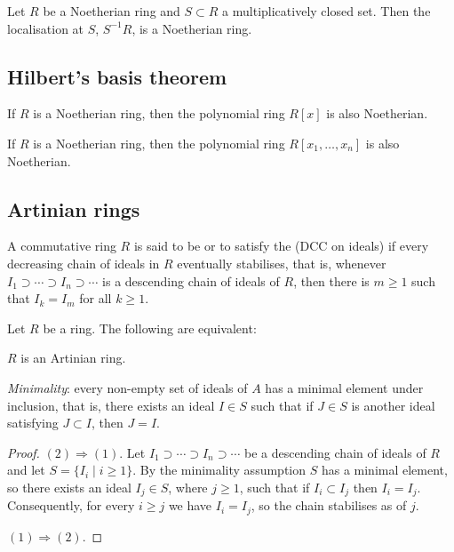 \begin{prop}
	Let $R$ be a Noetherian ring and $S \subset R$ a multiplicatively closed set. Then the localisation at $S$, $S^{-1} R$, is a Noetherian ring.
\end{prop}

\subsection{Hilbert's basis theorem}

\begin{theorem}
	If $R$ is a Noetherian ring, then the polynomial ring $R[x]$ is also Noetherian.
\end{theorem}

\begin{col}
	If $R$ is a Noetherian ring, then the polynomial ring $R[x_1, \ldots, x_n]$ is also Noetherian.
\end{col}

\subsection{Artinian rings}

\begin{definition}
	A commutative ring $R$ is said to be  or to satisfy the  (DCC on ideals) if every decreasing chain of ideals in $R$ eventually stabilises, that is, whenever $I_1 \supset \cdots \supset I_n \supset \cdots$ is a descending chain of ideals of $R$, then there is $m \geq 1$ such that $I_k = I_m$ for all $k \geq 1$.
\end{definition}

\begin{prop}
	Let $R$ be a ring. The following are equivalent:
	\begin{enumerateprop}
		\item $R$ is an Artinian ring.
		\item \emph{Minimality}: every non-empty set of ideals of $A$ has a minimal element under inclusion, that is, there exists an ideal $I \in S$ such that if $J \in S$ is another ideal satisfying $J \subset I$, then $J = I$. 
	\end{enumerateprop}
\end{prop}
\begin{proof}
	
	$(2) \Rightarrow (1)$. Let $I_1 \supset \cdots \supset I_n \supset \cdots$ be a descending chain of ideals of $R$ and let $S = \{ I_i \mid i \geq 1 \}$. By the minimality assumption $S$ has a minimal element, so there exists an ideal $I_j \in S$, where $j \geq 1$, such that if $I_i \subset I_j$ then $I_i = I_j$. Consequently, for every $i \geq j$ we have $I_i = I_j$, so the chain stabilises as of $j$.
	
	$(1) \Rightarrow (2)$. 
	
\end{proof}

